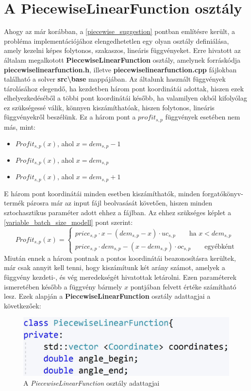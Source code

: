 \section{A PiecewiseLinearFunction osztály} \label{piecewise_class}
Ahogy az már korábban, a \ref{piecewise_suggestion} pontban említésre került, a probléma implementációjához elengedhetetlen egy olyan osztály definiálása, amely kezelni képes folytonos, szakaszos, lineáris függvényeket. Erre hivatott az általam megalkotott \textbf{PiecewiseLinearFunction} osztály, amelynek forráskódja \textbf{piecewiselinearfunction.h}, illetve \textbf{piecewiselinearfunction.cpp} fájlokban található a solver \textbf{src\textbackslash base} mappájában. Az általunk használt függvények tárolásához elegendő, ha kezdetben három pont koordinátái adottak, hiszen ezek elhelyezkedéséből a többi pont koordinátái később, ha valamilyen okból kifolyólag ez szükségessé válik, könnyen kiszámíthatóak, hiszen folytonos, lineáris függvényekről beszélünk. Ez a három pont a $profit_{s,p}$ függvények esetében nem más, mint: 
\begin{itemize}
\item $Profit_{s,p}(x)$\quad, ahol $x=dem_{s,p}-1$
\item $Profit_{s,p}(x)$\quad, ahol $x=dem_{s,p}$
\item $Profit_{s,p}(x)$\quad, ahol $x=dem_{s,p}+1$
\end{itemize} 
E három pont koordinátái minden esetben kiszámíthatók, minden forgatókönyv-termék párosra már az input fájl beolvasását követően, hiszen minden sztochasztikus paraméter adott ehhez a fájlban. Az ehhez szükséges képlet a \ref{variable_batch_size_modell} pont szerint:
\begin{equation*}
Profit_{s,p}(x)= \begin{cases}
            price_{s,p}\cdot x-(dem_{s,p}-x) \cdot uc_{s,p}\qquad \text{ha } x<dem_{s,p} \\
            price_{s,p} \cdot dem_{s,p}-(x-dem_{s,p}) \cdot oc_{s,p}\qquad \text{egyébként}
       \end{cases}
\end{equation*}
Miután ennek a három pontnak a pontos koordinátái beazonosításra kerültek, már csak annyit kell tenni, hogy kiszámítunk két arány számot, amelyek a függvény kezdeti-, és vég meredekségét hivatottak letárolni. Ezen paraméterek ismeretében később a függvény bármely $x$ pontjában felvett értéke számítható lesz. Ezek alapján a \textbf{PiecewiseLinearFunction} osztály adattagjai a következőek:
\begin{figure}[H]
\begin{center}
\includegraphics[scale=0.5]{piecewise_variables}
\caption{A \textit{PiecewiseLinearFunction} osztály adattagjai}
\label{piecewise_variables}
\end{center}
\end{figure} 
